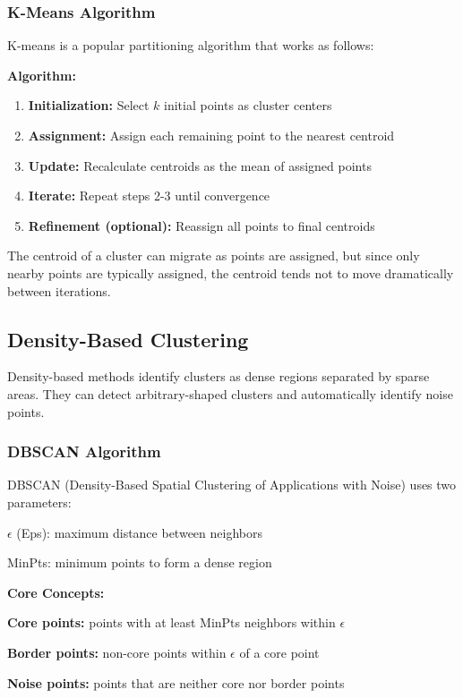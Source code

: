     \subsubsection{K-Means Algorithm}
    
    K-means is a popular partitioning algorithm that works as follows:
    
    \textbf{Algorithm:}
    \begin{enumerate}
        \item \textbf{Initialization:} Select $k$ initial points as cluster centers
        \item \textbf{Assignment:} Assign each remaining point to the nearest centroid
        \item \textbf{Update:} Recalculate centroids as the mean of assigned points
        \item \textbf{Iterate:} Repeat steps 2-3 until convergence
        \item \textbf{Refinement (optional):} Reassign all points to final centroids
    \end{enumerate}
    
    The centroid of a cluster can migrate as points are assigned, but since only nearby points are typically assigned, the centroid tends not to move dramatically between iterations.
    
    \subsection{Density-Based Clustering}
    
    Density-based methods identify clusters as dense regions separated by sparse areas. They can detect arbitrary-shaped clusters and automatically identify noise points.
    
    \subsubsection{DBSCAN Algorithm}
    
    DBSCAN (Density-Based Spatial Clustering of Applications with Noise) uses two parameters:
    \begin{compactitemize}
        \item $\epsilon$ (Eps): maximum distance between neighbors
        \item MinPts: minimum points to form a dense region
    \end{compactitemize}
    
    \textbf{Core Concepts:}
    \begin{compactitemize}
        \item \textbf{Core points:} points with at least MinPts neighbors within $\epsilon$
        \item \textbf{Border points:} non-core points within $\epsilon$ of a core point
        \item \textbf{Noise points:} points that are neither core nor border points
    \end{compactitemize}

